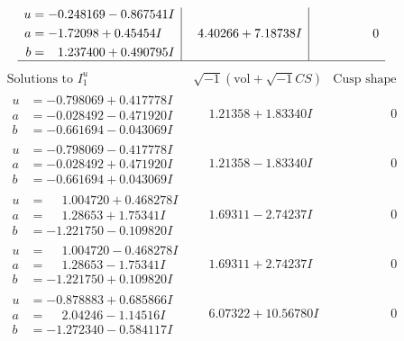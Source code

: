 \documentclass[1p]{elsarticle_modified}
\theoremstyle{definition}
\newcommand{\I}{\sqrt{-1}}
\begin{document}
$$\begin{array}{c|c|c}
\begin{aligned}
u &= -0.248169 - 0.867541 I \\
a &= -1.72098 + 0.45454 I \\
b &= \phantom{-}1.237400 + 0.490795 I\end{aligned}
 & \phantom{-}4.40266 + 7.18738 I & \phantom{-0.000000 } 0\\
 \hline 
 \end{array}$$\newpage$$\begin{array}{c|c|c}  
\text{Solutions to }I^u_{1}& \I (\text{vol} + \sqrt{-1}CS) & \text{Cusp shape}\\
 \hline 
\begin{aligned}
u &= -0.798069 + 0.417778 I \\
a &= -0.028492 - 0.471920 I \\
b &= -0.661694 - 0.043069 I\end{aligned}
 & \phantom{-}1.21358 + 1.83340 I & \phantom{-0.000000 } 0 \\ \hline\begin{aligned}
u &= -0.798069 - 0.417778 I \\
a &= -0.028492 + 0.471920 I \\
b &= -0.661694 + 0.043069 I\end{aligned}
 & \phantom{-}1.21358 - 1.83340 I & \phantom{-0.000000 } 0 \\ \hline\begin{aligned}
u &= \phantom{-}1.004720 + 0.468278 I \\
a &= \phantom{-}1.28653 + 1.75341 I \\
b &= -1.221750 - 0.109820 I\end{aligned}
 & \phantom{-}1.69311 - 2.74237 I & \phantom{-0.000000 } 0 \\ \hline\begin{aligned}
u &= \phantom{-}1.004720 - 0.468278 I \\
a &= \phantom{-}1.28653 - 1.75341 I \\
b &= -1.221750 + 0.109820 I\end{aligned}
 & \phantom{-}1.69311 + 2.74237 I & \phantom{-0.000000 } 0 \\ \hline\begin{aligned}
u &= -0.878883 + 0.685866 I \\
a &= \phantom{-}2.04246 - 1.14516 I \\
b &= -1.272340 - 0.584117 I\end{aligned}
 & \phantom{-}6.07322 + 10.56780 I & \phantom{-0.000000 } 0 \\ \hline\begin{aligned}

\end{aligned}
\end{array}$$
\end{document}

